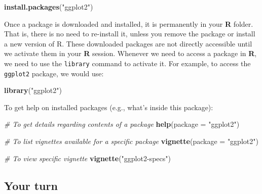 \documentclass[]{book}
\newenvironment{Shaded}{\begin{snugshade}}{\end{snugshade}}
\newcommand{\CommentTok}[1]{\textcolor[rgb]{0.56,0.35,0.01}{\textit{#1}}}
\newcommand{\DataTypeTok}[1]{\textcolor[rgb]{0.13,0.29,0.53}{#1}}
\newcommand{\KeywordTok}[1]{\textcolor[rgb]{0.13,0.29,0.53}{\textbf{#1}}}
\newcommand{\NormalTok}[1]{#1}
\newcommand{\StringTok}[1]{\textcolor[rgb]{0.31,0.60,0.02}{#1}}
\begin{document}
\begin{Shaded}
\begin{Highlighting}[]
\KeywordTok{install.packages}\NormalTok{(}\StringTok{"ggplot2"}\NormalTok{)}
\end{Highlighting}
\end{Shaded}

Once a package is downloaded and installed, it is permanently in your \textbf{R} folder. That is, there is no need to re-install it, unless you remove the package or install a new version of R. These downloaded packages are not directly accessible until we activate them in your \textbf{R} session. Whenever we need to access a package in \textbf{R}, we need to use the \texttt{library} command to activate it. For example, to access the \texttt{ggplot2} package, we would use:

\begin{Shaded}
\begin{Highlighting}[]
\KeywordTok{library}\NormalTok{(}\StringTok{"ggplot2"}\NormalTok{)}
\end{Highlighting}
\end{Shaded}

To get help on installed packages (e.g., what's inside this package):

\begin{Shaded}
\begin{Highlighting}[]
\CommentTok{# To get details regarding contents of a package}
\KeywordTok{help}\NormalTok{(}\DataTypeTok{package =} \StringTok{"ggplot2"}\NormalTok{)}

\CommentTok{# To list vignettes available for a specific package}
\KeywordTok{vignette}\NormalTok{(}\DataTypeTok{package =} \StringTok{"ggplot2"}\NormalTok{)}

\CommentTok{# To view specific vignette}
\KeywordTok{vignette}\NormalTok{(}\StringTok{"ggplot2-specs"}\NormalTok{)}
\end{Highlighting}
\end{Shaded}

\hypertarget{your-turn}{%
\subsection{Your turn}\label{your-turn}}
\end{document}
